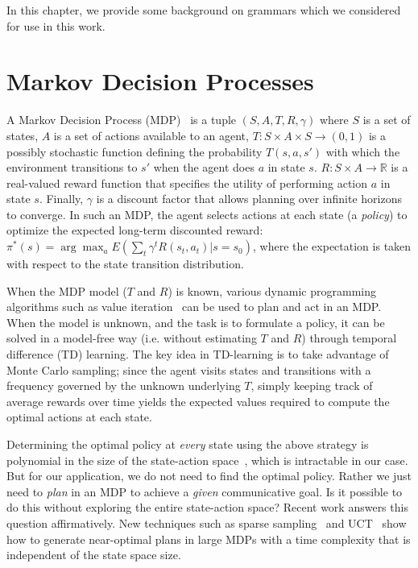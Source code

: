 In this chapter, we provide some background on grammars which we considered for use in this work.

\section{Markov Decision Processes}
A Markov Decision Process (MDP)~\cite{puterman_1994_markov}
is a tuple $(S, A, T, R, \gamma)$ where $S$ is a
set of states, $A$ is a set of actions available to an agent,
$T:S\times A\times S \rightarrow (0,1)$ is a possibly stochastic
function defining the probability $T(s,a,s')$ with which the
environment transitions to $s'$ when the agent does $a$ in state $s$.
$R:S\times A \rightarrow \mathbb{R}$ is a real-valued reward function that
specifies the utility of performing action $a$ in state $s$. Finally,
$\gamma$ is a discount factor that allows planning over infinite
horizons to converge. In such an MDP, the agent selects actions at
each state (a {\em policy}) to optimize the expected long-term
discounted reward: $\pi^*(s)=\arg \max_a E(\sum_t \gamma^t
R(s_t,a_t)|s=s_0)$, where the expectation is taken with respect to the
state transition distribution.

When the MDP model ($T$ and $R$) is
known, various dynamic programming algorithms such as value
iteration~\cite{bellman_1957_dynamic} can be used to plan and act in an MDP. When the
model is unknown, and the task is to formulate a policy, it can be
solved in a model-free way (i.e. without estimating $T$ and $R$)
through temporal difference (TD) learning. The key idea in TD-learning
is to take advantage of Monte Carlo sampling; since the agent visits
states and transitions with a frequency governed by the unknown
underlying $T$, simply keeping track of average rewards over time
yields the expected values required to compute the optimal actions at
each state.

Determining the optimal policy at {\em every} state using the above
strategy is polynomial in the size of the state-action
space~\cite{brafman_2003_rmax}, which is intractable in our case. But for our application, we do not
need to find the optimal policy. Rather we just need to {\em plan} in
an MDP to achieve a {\em given} communicative goal. Is it
possible to do this without exploring the entire state-action space?
Recent work answers this question affirmatively. New techniques such
as sparse sampling~\cite{kearns_1999_sparse} and
UCT~\cite{kocsis_bandit_2006} show how to generate near-optimal plans
in large MDPs with a time complexity that is independent of the state
space size. 

